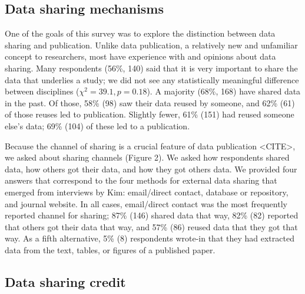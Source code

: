 \documentclass[10pt]{article}
\begin{document}
\subsection*{Data sharing mechanisms}

One of the goals of this survey was to explore the distinction between data sharing and publication.
Unlike data publication, a relatively new and unfamiliar concept to researchers, most have experience with and opinions about data sharing.
Many respondents (56\%, 140) said that it is very important to share the data that underlies a study; we did not see any statistically meaningful difference between disciplines ($\chi^{2}= 39.1, p= 0.18$). %
A majority (68\%, 168) have shared data in the past.
Of those, 58\% (98) saw their data reused by someone, and 62\% (61) of those reuses led to publication.
Slightly fewer, 61\% (151) had reused someone else's data; 69\% (104) of these led to a publication.

Because the channel of sharing is a crucial feature of data publication <CITE>, we asked about sharing channels (Figure 2).
We asked how respondents shared data, how others got their data, and how they got others data.
We provided four answers that correspond to the four methods for external data sharing that emerged from interviews by Kim\cite{kim_institutional_2012}: email/direct contact, database or repository, and journal website.
In all cases, email/direct contact was the most frequently reported channel for sharing; 87\% (146) shared data that way, 82\% (82) reported that others got their data that way, and 57\% (86) reused data that they got that way.
As a fifth alternative, 5\% (8) respondents wrote-in that they had extracted data from the text, tables, or figures of a published paper.

\subsection*{Data sharing credit}
\end{document}
